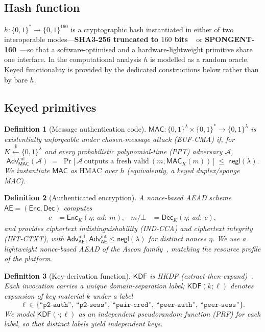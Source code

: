 \documentclass[11pt,a4paper]{article}
\theoremstyle{jrnlplain}
\theoremstyle{jrnldef}
\newtheorem{definition}{Definition}
\newcommand{\MAC}{\mathsf{MAC}}
\newcommand{\aead}{\mathsf{AE}}
\newcommand{\Enc}{\mathsf{Enc}}
\newcommand{\Dec}{\mathsf{Dec}}
\newcommand{\KDF}{\mathsf{KDF}}
\newcommand{\adv}{\mathcal{A}}
\newcommand{\secpar}{\lambda}
\newcommand{\bits}{\{0,1\}}
\newcommand{\getsr}{\xleftarrow{\$}}
\newcommand{\negl}{\mathsf{negl}}
\newcommand{\Adv}{\mathsf{Adv}}
\newcommand{\lbl}[1]{\text{``}\texttt{#1}\text{''}}
\begin{document}
\subsection{Hash function}
$h:\bits^\ast\to\bits^{160}$ is a cryptographic hash instantiated in either of
two interoperable modes---\textbf{SHA3-256 truncated to $160$ bits}%
~\cite{fips202} or \textbf{SPONGENT-160}~\cite{bogdanov2011}---so that a
software-optimised and a hardware-lightweight primitive share one interface.
In the computational analysis $h$ is modelled as a random oracle. Keyed
functionality is provided by the dedicated constructions below rather than by
bare $h$.

\medskip
\subsection{Keyed primitives}

\begin{definition}[Message authentication code]
$\MAC:\bits^{\secpar}\times\bits^\ast\to\bits^{\secpar}$ is
\emph{existentially unforgeable under chosen-message attack} (EUF-CMA) if, for
$K\getsr\bits^{\secpar}$ and every probabilistic polynomial-time (PPT)
adversary $\adv$,
\begin{equation}
\Adv^{\mathrm{euf}}_{\MAC}(\adv)
   \;=\; \Pr\!\big[\,\adv\ \text{outputs a fresh valid}\ (m,\MAC_K(m))\,\big]
   \;\le\; \negl(\secpar).
\end{equation}
We instantiate $\MAC$ as $\mathrm{HMAC}$ over $h$ (equivalently, a keyed
duplex/sponge MAC).
\end{definition}

\begin{definition}[Authenticated encryption]
A nonce-based AEAD scheme $\aead=(\Enc,\Dec)$ computes
\begin{align}
c &= \Enc_K(\eta;\ \mathit{ad};\ m),
   &
m/\!\bot &= \Dec_K(\eta;\ \mathit{ad};\ c),
\end{align}
and provides ciphertext indistinguishability (IND-CCA) and ciphertext
integrity (INT-CTXT), with
$\Adv^{\mathrm{ind}}_{\aead},\Adv^{\mathrm{int}}_{\aead}\le\negl(\secpar)$ for
distinct nonces $\eta$. We use a lightweight nonce-based AEAD of the
Ascon family~\cite{ascon}, matching the resource profile of the platform.
\end{definition}

\begin{definition}[Key-derivation function]
$\KDF$ is HKDF (extract-then-expand)~\cite{krawczyk2010}. Each invocation
carries a unique \emph{domain-separation label}; $\KDF(k;\ell)$ denotes
expansion of key material $k$ under a label
\begin{equation}
\ell\in\{\lbl{p2-auth},\ \lbl{p2-sess},\ \lbl{pair-cred},\
         \lbl{peer-auth},\ \lbl{peer-sess}\}.
\end{equation}
We model $\KDF(\cdot;\ell)$ as an independent pseudorandom function (PRF) for
each label, so that distinct labels yield independent keys.
\end{definition}
\end{document}
